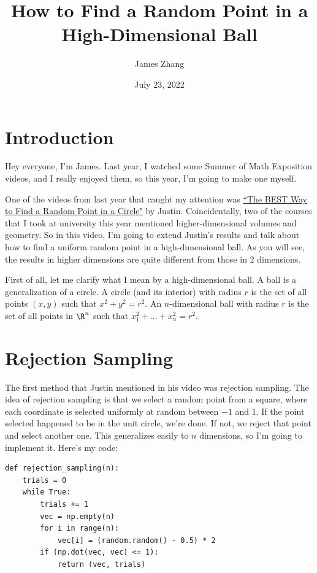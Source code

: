 \documentclass{article}
\title{How to Find a Random Point in a High-Dimensional Ball}
\author{James Zhang}
\date{July 23, 2022}
\begin{document}
\maketitle

\section{Introduction}

Hey everyone, I'm James. Last year, I watched some Summer of Math Exposition videos, and I really enjoyed them, so this year, I'm going to make one myself.

One of the videos from last year that caught my attention was \href{https://www.youtube.com/watch?v=4y_nmpv-9lI&list=PLnQX-jgAF5pTkwtUuVpqS5tuWmJ-6ZM-Z&index=6&t=3s}{``The BEST Way to Find a Random Point in a Circle"} by Justin. Coincidentally, two of the courses that I took at university this year mentioned higher-dimensional volumes and geometry. So in this video, I'm going to extend Justin's results and talk about how to find a uniform random point in a high-dimensional ball. As you will see, the results in higher dimensions are quite different from those in 2 dimensions.

First of all, let me clarify what I mean by a high-dimensional ball. A ball is a generalization of a circle. A circle (and its interior) with radius $r$ is the set of all points $(x, y)$ such that $x^2 + y^2 = r^2$. An $n$-dimensional ball with radius $r$ is the set of all points in $\R^n$ such that $x_1^2 + \ldots + x_n^2 = r^2$.

\section{Rejection Sampling}

The first method that Justin mentioned in his video was rejection sampling. The idea of rejection sampling is that we select a random point from a square, where each coordinate is selected uniformly at random between $-1$ and 1. If the point selected happened to be in the unit circle, we're done. If not, we reject that point and select another one. This generalizes easily to $n$ dimensions, so I'm going to implement it. Here's my code:

\begin{verbatim}
def rejection_sampling(n):
    trials = 0
    while True:
        trials += 1
        vec = np.empty(n)
        for i in range(n):
            vec[i] = (random.random() - 0.5) * 2
        if (np.dot(vec, vec) <= 1):
            return (vec, trials)
\end{verbatim}
\end{document}
